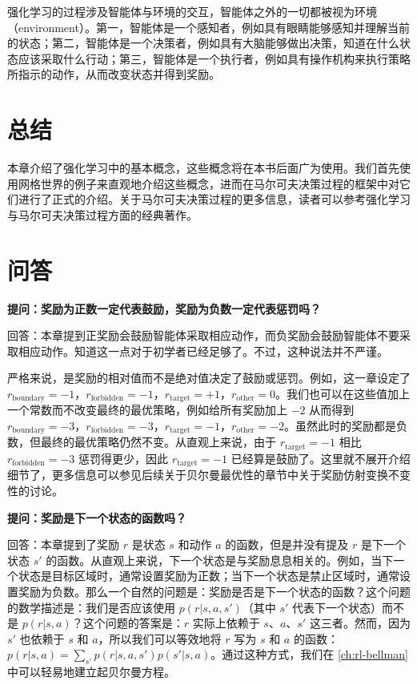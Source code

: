 强化学习的过程涉及智能体与环境的交互，智能体之外的一切都被视为环境（environment）。第一，智能体是一个感知者，例如具有眼睛能够感知并理解当前的状态；第二，智能体是一个决策者，例如具有大脑能够做出决策，知道在什么状态应该采取什么行动；第三，智能体是一个执行者，例如具有操作机构来执行策略所指示的动作，从而改变状态并得到奖励。

\section{总结}
\label{sec:rl-basic-summary}

本章介绍了强化学习中的基本概念，这些概念将在本书后面广为使用。我们首先使用网格世界的例子来直观地介绍这些概念，进而在马尔可夫决策过程的框架中对它们进行了正式的介绍。关于马尔可夫决策过程的更多信息，读者可以参考强化学习与马尔可夫决策过程方面的经典著作。

\section{问答}
\label{sec:rl-basic-qa}

\textbf{提问：奖励为正数一定代表鼓励，奖励为负数一定代表惩罚吗？}

回答：本章提到正奖励会鼓励智能体采取相应动作，而负奖励会鼓励智能体不要采取相应动作。知道这一点对于初学者已经足够了。不过，这种说法并不严谨。

严格来说，是奖励的相对值而不是绝对值决定了鼓励或惩罚。例如，这一章设定了 $r_{\mathrm{boundary}} = -1$，$r_{\mathrm{forbidden}} = -1$，$r_{\mathrm{target}} = +1$，$r_{\mathrm{other}} = 0$。我们也可以在这些值加上一个常数而不改变最终的最优策略，例如给所有奖励加上 $-2$ 从而得到 $r_{\mathrm{boundary}} = -3$，$r_{\mathrm{forbidden}} = -3$，$r_{\mathrm{target}} = -1$，$r_{\mathrm{other}} = -2$。虽然此时的奖励都是负数，但最终的最优策略仍然不变。从直观上来说，由于 $r_{\mathrm{target}} = -1$ 相比 $r_{\mathrm{forbidden}} = -3$ 惩罚得更少，因此 $r_{\mathrm{target}} = -1$ 已经算是鼓励了。这里就不展开介绍细节了，更多信息可以参见后续关于贝尔曼最优性的章节中关于奖励仿射变换不变性的讨论。

\medskip
\textbf{提问：奖励是下一个状态的函数吗？}

回答：本章提到了奖励 $r$ 是状态 $s$ 和动作 $a$ 的函数，但是并没有提及 $r$ 是下一个状态 $s'$ 的函数。从直观上来说，下一个状态是与奖励息息相关的。例如，当下一个状态是目标区域时，通常设置奖励为正数；当下一个状态是禁止区域时，通常设置奖励为负数。那么一个自然的问题是：奖励是否是下一个状态的函数？这个问题的数学描述是：我们是否应该使用 $p(r|s,a,s')$（其中 $s'$ 代表下一个状态）而不是 $p(r|s,a)$？这个问题的答案是：$r$ 实际上依赖于 $s$、$a$、$s'$ 这三者。然而，因为 $s'$ 也依赖于 $s$ 和 $a$，所以我们可以等效地将 $r$ 写为 $s$ 和 $a$ 的函数：$p(r|s,a) = \sum_{s'} p(r|s,a,s') p(s'|s,a)$。通过这种方式，我们在 \cref{ch:rl-bellman} 中可以轻易地建立起贝尔曼方程。

